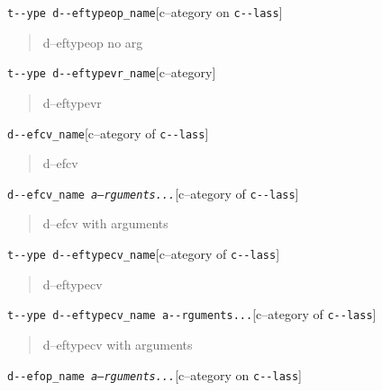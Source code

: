 \documentclass{book}
\begin{document}
\noindent\texttt{t{-}{-}ype d{-}{-}eftypeop\_name}\hfill[c--ategory on \texttt{c{-}{-}lass}]

%
\begin{quote}
\unskip{\parskip=0pt\noindent}%
d--eftypeop no arg
\end{quote}

\noindent\texttt{t{-}{-}ype d{-}{-}eftypevr\_name}\hfill[c--ategory]

%
\begin{quote}
\unskip{\parskip=0pt\noindent}%
d--eftypevr
\end{quote}

\noindent\texttt{d{-}{-}efcv\_name}\hfill[c--ategory of \texttt{c{-}{-}lass}]

%
\begin{quote}
\unskip{\parskip=0pt\noindent}%
d--efcv
\end{quote}

\noindent\texttt{d{-}{-}efcv\_name \EmbracOn{}\textnormal{\textsl{a--rguments...}}\EmbracOff{}}\hfill[c--ategory of \texttt{c{-}{-}lass}]

%
\begin{quote}
\unskip{\parskip=0pt\noindent}%
d--efcv with arguments
\end{quote}

\noindent\texttt{t{-}{-}ype d{-}{-}eftypecv\_name}\hfill[c--ategory of \texttt{c{-}{-}lass}]

%
\begin{quote}
\unskip{\parskip=0pt\noindent}%
d--eftypecv
\end{quote}

\noindent\texttt{t{-}{-}ype d{-}{-}eftypecv\_name a{-}{-}rguments...}\hfill[c--ategory of \texttt{c{-}{-}lass}]

%
\begin{quote}
\unskip{\parskip=0pt\noindent}%
d--eftypecv with arguments
\end{quote}

\noindent\texttt{d{-}{-}efop\_name \EmbracOn{}\textnormal{\textsl{a--rguments...}}\EmbracOff{}}\hfill[c--ategory on \texttt{c{-}{-}lass}]
\end{document}
